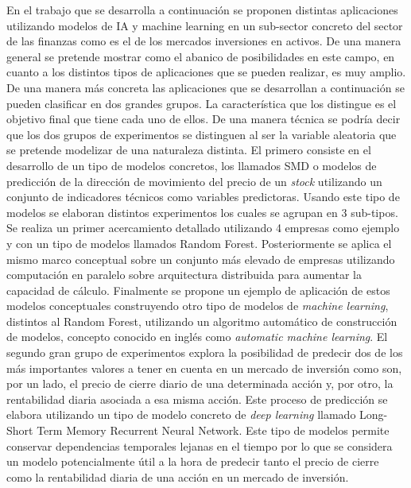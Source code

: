 \documentclass[]{DissertateUSU}
\begin{document}
\noindent En el trabajo que se desarrolla a continuación se proponen
distintas aplicaciones utilizando modelos de IA y machine learning en un
sub-sector concreto del sector de las finanzas como es el de los
mercados inversiones en activos. De una manera general se pretende
mostrar como el abanico de posibilidades en este campo, en cuanto a los
distintos tipos de aplicaciones que se pueden realizar, es muy amplio.
De una manera más concreta las aplicaciones que se desarrollan a
continuación se pueden clasificar en dos grandes grupos. La
característica que los distingue es el objetivo final que tiene cada uno
de ellos. De una manera técnica se podría decir que los dos grupos de
experimentos se distinguen al ser la variable aleatoria que se pretende
modelizar de una naturaleza distinta. El primero consiste en el
desarrollo de un tipo de modelos concretos, los llamados SMD o modelos
de predicción de la dirección de movimiento del precio de un
\emph{stock} utilizando un conjunto de indicadores técnicos como
variables predictoras. Usando este tipo de modelos se elaboran distintos
experimentos los cuales se agrupan en 3 sub-tipos. Se realiza un primer
acercamiento detallado utilizando 4 empresas como ejemplo y con un tipo
de modelos llamados Random Forest. Posteriormente se aplica el mismo
marco conceptual sobre un conjunto más elevado de empresas utilizando
computación en paralelo sobre arquitectura distribuida para aumentar la
capacidad de cálculo. Finalmente se propone un ejemplo de aplicación de
estos modelos conceptuales construyendo otro tipo de modelos de
\emph{machine learning}, distintos al Random Forest, utilizando un
algoritmo automático de construcción de modelos, concepto conocido en
inglés como \emph{automatic machine learning}. El segundo gran grupo de
experimentos explora la posibilidad de predecir dos de los más
importantes valores a tener en cuenta en un mercado de inversión como
son, por un lado, el precio de cierre diario de una determinada acción
y, por otro, la rentabilidad diaria asociada a esa misma acción. Este
proceso de predicción se elabora utilizando un tipo de modelo concreto
de \emph{deep learning} llamado Long-Short Term Memory Recurrent Neural
Network. Este tipo de modelos permite conservar dependencias temporales
lejanas en el tiempo por lo que se considera un modelo potencialmente
útil a la hora de predecir tanto el precio de cierre como la
rentabilidad diaria de una acción en un mercado de inversión.

\justifying
\end{document}
